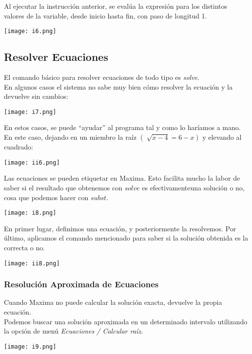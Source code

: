 \documentclass[12pt]{article}
\begin{document}
Al ejecutar la instrucción anterior, se evalúa la expresión para los distintos valores de la
variable, desde inicio hasta fin, con paso de longitud 1.
\begin{center}
    \texttt{[image: i6.png]}\\
\end{center}

\subsection*{Resolver Ecuaciones}
El comando básico para resolver ecuaciones de todo tipo es \textit{solve}.\\
En algunos casos el sistema no sabe muy bien cómo resolver la ecuación y  la devuelve sin cambios:
\begin{center}
    \texttt{[image: i7.png]}\\
\end{center}


En estos casos, se puede “ayudar” al programa tal y como lo haríamos a mano. En este caso, dejando en un miembro la raíz $( \sqrt[]{x-4}=6-x)$ y elevando al cuadrado:

\begin{center}
   \texttt{[image: ii6.png]}\\
\end{center}

Las ecuaciones se pueden etiquetar  en Maxima. Esto facilita mucho la labor de saber si el resultado que obtenemos con $solve$ es efectivamenteuna solución o no, cosa que podemos hacer con $subst$.

\begin{center}
   \texttt{[image: i8.png]}\\
\end{center}

En primer lugar, definimos una ecuación, y posteriormente la resolvemos. Por último, aplicamos el comando mencionado para saber si la solución obtenida es la correcta o no.
\begin{center}
   \texttt{[image: ii8.png]}\\
\end{center}

\subsubsection*{Resolución Aproximada de Ecuaciones}
Cuando Maxima no puede calcular la solución exacta, devuelve la propia ecuación.\\
Podemos buscar una solución aproximada en un determinado intervalo utilizando la opción de menú \textit{Ecuaciones / Calcular raíz}.
\begin{center}
   \texttt{[image: i9.png]}\\
\end{center}
\end{document}
